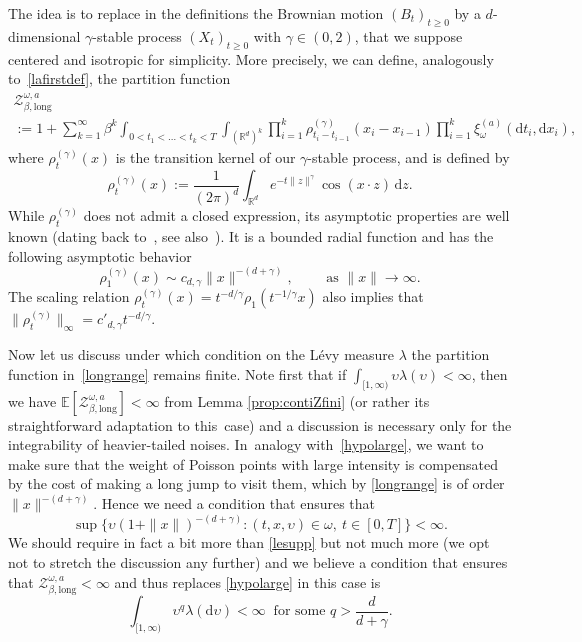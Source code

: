 \documentclass[JEP,XML,SOM,Unicode,published]{cedram}
\let\mathcal\mathscr
\let\sep:
\theoremstyle{definition}
\newcommand{\dd}{\mathrm{d}}
\newcommand{\R}{\mathbb{R}}
\newcommand{\cZ}{{\ensuremath{\mathcal Z}} }
\newcommand{\bbE}{{\ensuremath{\mathbb E}} }
\newcommand{\bbR}{{\ensuremath{\mathbb R}} }
\let\gb\beta
\let\gl\lambda
\let\ups\upsilon
\let\go\omega
\begin{document}
The idea is to replace in the definitions the
Brownian motion $(B_t)_{t\geq 0}$
by a $d$\nobreakdash-dimen\-sional $\gamma$-stable process $(X_t)_{t\geq 0}$ with $\gamma\in (0,2)$, that we suppose centered and isotropic for simplicity. More precisely, we can define, analogously to~\eqref{lafirstdef}, the partition function\vspace*{-5pt}
\begin{multline}
\label{longrange}
\cZ_{\gb,\mathrm{long}}^{\go,a}\\[-5pt]
:= 1+\sum_{k=1}^\infty \beta^k\int_{0<t_1<\dots<t_k<T}\int_{(\bbR^d)^k} \prod_{i=1}^k \rho^{(\gamma)}_{t_i-t_{i-1}} (x_i-x_{i-1}) \prod_{i=1}^k \xi_{\go}^{(a)} (\dd t_i, \dd x_i),
\end{multline}
where $\rho_{t}^{(\gamma)}(x)$ is the transition kernel
of our $\gamma$-stable process, and is defined by
\[
\rho_t^{(\gamma)}(x) := \frac{1}{(2\pi)^d} \int_{\R^d} e^{-t \|z\|^{\gamma}} \cos(x \cdot z) \,\dd z.
\]
While $\rho_t^{(\gamma)}$ does not admit a closed expression, its asymptotic properties are well known (dating back to~\cite{K70}, see also~\cite[Ch.\,2]{ST94}).
It is a bounded radial function and has
the following asymptotic behavior
\begin{equation}\label{thetail}
\rho_1^{(\gamma)} (x) \sim c_{d,\gamma} \|x\|^{-(d+\gamma)},
\qquad \text{ as }
\| x\|\to \infty.
\end{equation}
The scaling relation
$\rho_{t}^{(\gamma)}(x) = t^{-d/\gamma} \rho_1(t^{-1/\gamma} x)$
also implies that $\|\rho_{t}^{(\gamma)} \|_{\infty}= c'_{d,\gamma} t^{-d/\gamma}.$

Now let us discuss under which condition on the Lévy measure $\gl$ the partition function in~\eqref{longrange} remains finite. Note first that if $\int_{[1,\infty)} \ups \gl(\ups)<\infty$, then we have $\bbE [ \cZ_{\gb,\mathrm{long}}^{\go,a} ]<\infty$ from Lemma \ref{prop:contiZfini} (or rather its straightforward adaptation to this~case) and a discussion is necessary only for the integrability of heavier-tailed noises.
In~analogy with~\eqref{hypolarge}, we want to make sure that
the weight of Poisson points with large intensity is compensated by the cost of making a long jump to visit them, which by \eqref{longrange} is of order
$\|x\|^{-(d+\gamma)}$. Hence we need a condition that ensures that
\begin{equation}\label{lesupp}
\sup \bigl\{ \ups (1+ \|x\|)^{-(d+\gamma)} \sep (t,x,\ups) \in \go, \ t\in[0,T] \bigr\} <\infty.
\end{equation}
We should require in fact a bit more than \eqref{lesupp} but not much more (we opt not to stretch the discussion any further) and we believe
a condition that ensures that $\cZ_{\gb,\mathrm{long}}^{\go,a}<\infty$ and thus replaces \eqref{hypolarge} in this case is
\begin{equation}
\label{hypolargelongrange}
\int_{[1,\infty)} \ups^{q} \lambda(\dd \ups) <\infty
\ \text{ for some } q> \frac{d}{d+\gamma}.
\end{equation}
\end{document}
